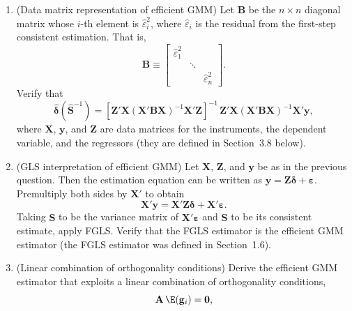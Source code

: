 \begin{enumerate}
\item (Data matrix representation of efficient GMM) \; Let $\mathbf{B}$ be the $n \times n$
  diagonal matrix whose $i$-th element is $\hat{\varepsilon}_i^2$, where $\hat{\varepsilon}_i$ is the
  residual from the first-step consistent estimation.  That is,
  \[
    \mathbf{B} \equiv \begin{bmatrix} \hat{\varepsilon}_1^2 & & \\ & \ddots & \\
    & & \hat{\varepsilon}_n^2 \end{bmatrix}.
  \]
  Verify that
  \[
    \hat{\boldsymbol{\delta}}(\hat{\mathbf{S}}^{-1})
    = [\mathbf{Z}'\mathbf{X}(\mathbf{X}'\mathbf{B}\mathbf{X})^{-1}\mathbf{X}'\mathbf{Z}]^{-1}\,
      \mathbf{Z}'\mathbf{X}(\mathbf{X}'\mathbf{B}\mathbf{X})^{-1}\mathbf{X}'\mathbf{y},
  \]
  where $\mathbf{X}$, $\mathbf{y}$, and $\mathbf{Z}$ are data matrices for the instruments, the dependent
  variable, and the regressors (they are defined in Section~3.8 below).

\item (GLS interpretation of efficient GMM) \; Let $\mathbf{X}$, $\mathbf{Z}$, and $\mathbf{y}$ be as in
  the previous question.  Then the estimation equation can be written as
  $\mathbf{y} = \mathbf{Z}\boldsymbol{\delta} + \boldsymbol{\varepsilon}$.  Premultiply both sides by
  $\mathbf{X}'$ to obtain
  \[
    \mathbf{X}'\mathbf{y} = \mathbf{X}'\mathbf{Z}\boldsymbol{\delta}
    + \mathbf{X}'\boldsymbol{\varepsilon}.
  \]
  Taking $\mathbf{S}$ to be the variance matrix of $\mathbf{X}'\boldsymbol{\varepsilon}$ and
  $\hat{\mathbf{S}}$ to be its consistent estimate, apply FGLS.  Verify that the FGLS estimator is
  the efficient GMM estimator (the FGLS estimator was defined in Section~1.6).

\item (Linear combination of orthogonality conditions) \; Derive the efficient GMM
  estimator that exploits a linear combination of orthogonality conditions,
  \[
    \mathbf{A}\,\E(\mathbf{g}_i) = \mathbf{0},
  \]
\end{enumerate}
